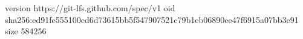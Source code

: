 version https://git-lfs.github.com/spec/v1
oid sha256:ed91fe555100cd6d73615bb5f547907521c79b1eb06890ee47f6915a07bb3e91
size 584256
